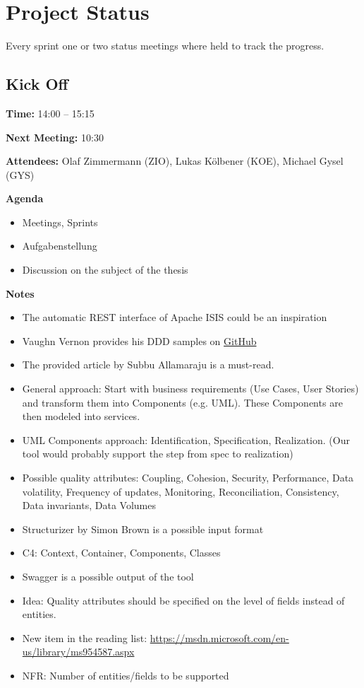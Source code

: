 \section{Project Status}

Every sprint one or two status meetings where held to track the progress.

\subsection{Kick Off }

\textbf{Time:} 14:00 – 15:15

\textbf{Next Meeting:}  10:30

\textbf{Attendees:} Olaf Zimmermann (ZIO), Lukas Kölbener (KOE), Michael Gysel (GYS)

\textbf{Agenda}
\begin{itemize}
\item Meetings, Sprints
\item Aufgabenstellung
\item Discussion on the subject of the thesis
\end{itemize}

\textbf{Notes}
\begin{itemize}
\item The automatic REST interface of Apache ISIS could be an inspiration
\item Vaughn Vernon provides his DDD samples on \href{https://github.com/VaughnVernon/IDDD_Samples}{GitHub}
\item The provided article by Subbu Allamaraju is a must-read.
\item General approach: Start with business requirements (Use Cases, User Stories) and transform them into Components (e.g. UML). These Components are then modeled into services.
\item UML Components approach: Identification, Specification, Realization. (Our tool would probably support the step from spec to realization)
\item Possible quality attributes: Coupling, Cohesion, Security, Performance, Data volatility, Frequency of updates, Monitoring, Reconciliation, Consistency, Data invariants, Data Volumes
\item Structurizer by Simon Brown is a possible input format
\item C4: Context, Container, Components, Classes
\item Swagger is a possible output of the tool
\item Idea: Quality attributes should be specified on the level of fields instead of entities.
\item New item in the reading list: \url{https://msdn.microsoft.com/en-us/library/ms954587.aspx} 
\item NFR: Number of entities/fields to be supported
\end{itemize}

